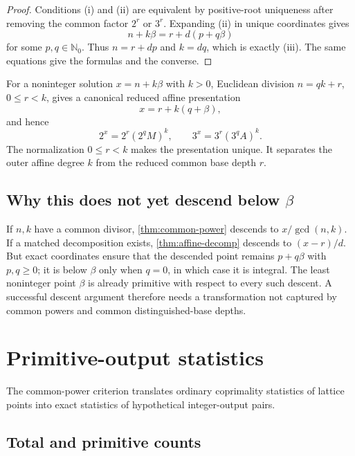 \documentclass[11pt,oneside]{article}
\theoremstyle{definition}
\newcommand{\Nzero}{\mathbb N_0}
\begin{document}
\begin{proof}
Conditions (i) and (ii) are equivalent by positive-root uniqueness after removing the common
factor \(2^r\) or \(3^r\).  Expanding (ii) in unique coordinates gives
\[
  n+k\beta=r+d(p+q\beta)
\]
for some \(p,q\in\Nzero\).  Thus \(n=r+dp\) and \(k=dq\), which is exactly (iii).
The same equations give the formulas and the converse.
\end{proof}

For a noninteger solution \(x=n+k\beta\) with \(k>0\), Euclidean division
\(n=qk+r\), \(0\le r<k\), gives a canonical reduced affine presentation
\begin{equation}\label{eq:euclidean-affine}
  \boxed{\quad x=r+k(q+\beta),\quad}
\end{equation}
and hence
\[
  2^x=2^r(2^qM)^k,
  \qquad
  3^x=3^r(3^qA)^k.
\]
The normalization \(0\le r<k\) makes the presentation unique.  It separates the outer
affine degree \(k\) from the reduced common base depth \(r\).

\subsection{Why this does not yet descend below \texorpdfstring{\(\beta\)}{beta}}

If \(n,k\) have a common divisor, \cref{thm:common-power} descends to
\(x/\gcd(n,k)\).  If a matched decomposition exists, \cref{thm:affine-decomp} descends to
\((x-r)/d\).  But exact coordinates ensure that the descended point remains
\(p+q\beta\) with \(p,q\ge0\); it is below \(\beta\) only when \(q=0\), in which case
it is integral.  The least noninteger point \(\beta\) is already primitive with respect
to every such descent.  A successful descent argument therefore needs a transformation
not captured by common powers and common distinguished-base depths.

\section{Primitive-output statistics}\label{sec:primitive-counting}

The common-power criterion translates ordinary coprimality statistics of lattice points
into exact statistics of hypothetical integer-output pairs.

\subsection{Total and primitive counts}
\end{document}
